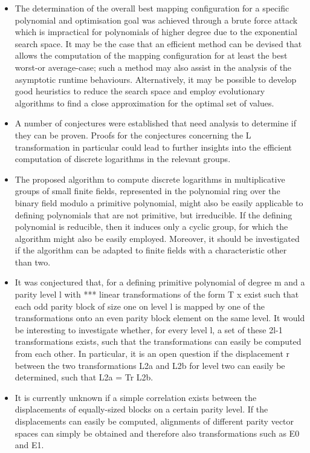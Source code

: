\documentclass[a4paper, 11pt]{article}
\begin{document}
\begin{itemize}
\item The determination of the overall best mapping configuration for a specific polynomial and optimisation goal was achieved through a brute force attack which is impractical for polynomials of higher degree due to the exponential search space. It may be the case that an efficient method can be devised that allows the computation of the mapping configuration for at least the best worst-or average-case; such a method may also assist in the analysis of the asymptotic runtime behaviours. Alternatively, it may be possible to develop good heuristics to reduce the search space and employ evolutionary algorithms to find a close approximation for the optimal set of values.

\item A number of conjectures were established that need analysis to determine if they can be proven. Proofs for the conjectures concerning the L transformation in particular could lead to further insights into the efficient computation of discrete logarithms in the relevant groups.

\item The proposed algorithm to compute discrete logarithms in multiplicative groups of small finite fields, represented in the polynomial ring over the binary field modulo a primitive polynomial, might also be easily applicable to defining polynomials that are not primitive, but irreducible. If the defining polynomial is reducible, then it induces only a cyclic group, for which the algorithm might also be easily employed. Moreover, it should be investigated if the algorithm can be adapted to finite fields with a characteristic other than two.

\item It was conjectured that, for a defining primitive polynomial of degree m and a parity level l with *** linear transformations of the form T x exist such that each odd parity block of size one on level l is mapped by one of the transformations onto an even parity block element on the same level. It would be interesting to investigate whether, for every level l, a set of these 2l-1 transformations exists, such that the transformations can easily be computed from each other. In particular, it is an open question if the displacement r between the two transformations L2a and L2b for level two can easily be determined, such that L2a = Tr L2b.

\item It is currently unknown if a simple correlation exists between the displacements of equally-sized blocks on a certain parity level. If the displacements can easily be computed, alignments of different parity vector spaces can simply be obtained and therefore also transformations such as E0 and E1.
\end{itemize}
\end{document}

